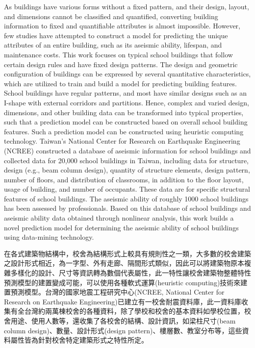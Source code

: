 As buildings have various forms without a fixed pattern, and their design, layout, and dimensions cannot be classified and quantified, converting building information to fixed and quantifiable attributes is almost impossible. However, few studies have attempted to construct a model for predicting the unique attributes of an entire building, such as its aseismic ability, lifespan, and maintenance costs. This work focuses on typical school buildings that follow certain design rules and have fixed design patterns. The design and geometric configuration of buildings can be expressed by several quantitative characteristics, which are utilized to train and build a model for predicting building features. School buildings have regular patterns, and most have similar designs such as an I-shape with external corridors and partitions. Hence, complex and varied design, dimensions, and other building data can be transformed into typical properties, such that a prediction model can be constructed based on overall school building features. Such a prediction model can be constructed using heuristic computing technology. Taiwan’s National Center for Research on Earthquake Engineering (NCREE) constructed a database of aseismic information for school buildings and collected data for 20,000 school buildings in Taiwan, including data for structure, design (e.g., beam column design), quantity of structure elements, design pattern, number of floors, and distribution of classrooms, in addition to the floor layout, usage of building, and number of occupants. These data are for specific structural features of school buildings. The aseismic ability of roughly 1000 school buildings has been assessed by professionals. Based on this database of school buildings and aseismic ability data obtained through nonlinear analysis, this work builds a novel prediction model for determining the aseismic ability of school buildings using data-mining technology.

在各式建築物結構中，校舍為結構形式上較具有規則性之一類，大多數的校舍建築之設計形式相近，為一字型、外有走廊、隔間形式類似，因此可以將建築物原本複雜多樣化的設計、尺寸等資訊轉為數個代表屬性，此一特性讓校舍建築物整體特性預測模型的建置變成可能，可以使用各種軟式運算(heuristic computing)技術來建置預測模型。台灣的國家地震工程研究中心(NCREE, National Center for Research on Earthquake Engineering)已建立有一校舍耐震資料庫，此一資料庫收集有全台灣約兩萬棟校舍的各種資料，除了學校和校舍的基本資料如學校位置，校舍用途、使用人數等，還收集了各校舍的結構、設計資訊，如梁柱尺寸(beam column design)、數量、設計形式(design pattern)、樓層數、教室分布等，這些資料屬性皆為針對校舍特定建築形式之特性所定。


